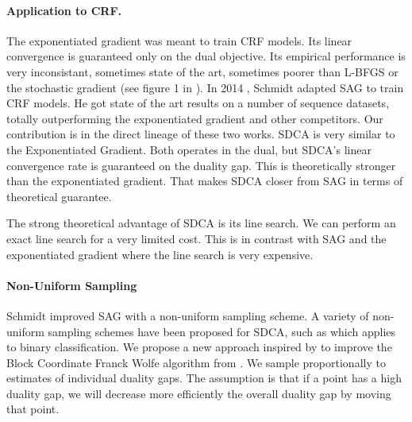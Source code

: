 \documentclass{article}
\DeclareMathOperator{\1}{\mathbb{1}}
\begin{document}
\paragraph{Application to CRF.}
The exponentiated gradient was meant to train CRF models.
Its linear convergence is guaranteed only on the dual objective.
Its empirical performance is very inconsistant, sometimes state of the art, sometimes poorer than L-BFGS or the stochastic gradient (see figure 1 in \cite{schmidt_non-uniform_2015}). 
In 2014 \cite{schmidt_non-uniform_2015}, Schmidt adapted SAG to train CRF models.
He got state of the art results on a number of sequence datasets, totally outperforming the exponentiated gradient and other competitors.
Our contribution is in the direct lineage of these two works.
SDCA is very similar to the Exponentiated Gradient.
Both operates in the dual, but SDCA's linear convergence rate is  guaranteed on the duality gap.
This is theoretically stronger than the exponentiated gradient.
That makes SDCA closer from SAG in terms of theoretical guarantee.

The strong theoretical advantage of SDCA is its line search.
We can perform an exact line search for a very limited cost.
This is in contrast with SAG and the exponentiated gradient where the line search is very expensive.

\paragraph{Non-Uniform Sampling}
Schmidt improved SAG with a non-uniform sampling scheme.
A variety of non-uniform sampling schemes have been proposed for SDCA, such as \cite{csiba_stochastic_2015} which applies to binary classification.
We propose a new approach inspired by \cite{osokin_minding_2016} to improve the Block Coordinate Franck Wolfe algorithm from \cite{lacoste-julien_block-coordinate_2012}.
We sample proportionally to estimates of individual duality gaps.
The assumption is that if a point has a high duality gap, we will decrease more efficiently  the overall duality gap by moving that point. 
\end{document}
